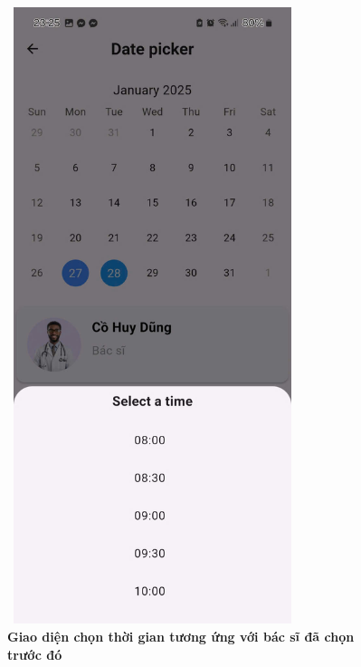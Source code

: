 \begin{figure}[H]
	\centering
	\includegraphics[width=8.5cm,height=18cm]{Images/AppUI/selectTimeWithDoctorPick.jpg}
	\caption[Giao diện chọn thời gian tương ứng với bác sĩ đã chọn trước đó]{\bfseries \fontsize{12pt}{0pt}\selectfont Giao diện chọn thời gian tương ứng với bác sĩ đã chọn trước đó}
	\label{TimePickWithDoctor}
\end{figure}

